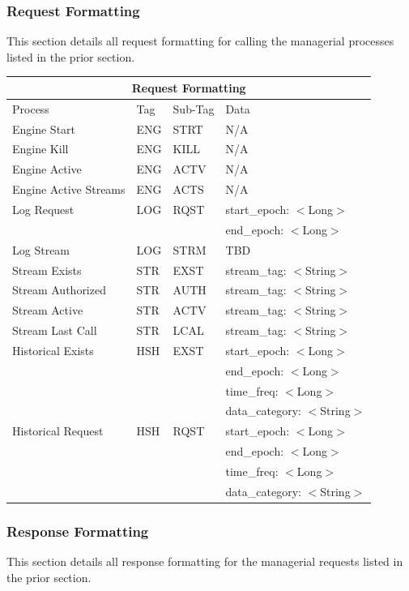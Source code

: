 \documentclass{article}
\begin{document}
\subsubsection{Request Formatting}
This section details all request formatting for calling the managerial processes listed in the prior section.

\begin{center}
\begin{tabular}{ | p{5cm} || p{2cm} | p{2cm} | p{6cm} | }
\hline
\multicolumn{4}{|c|}{Request Formatting}\\
\hline
Process & Tag & Sub-Tag & Data\\
\hline
Engine Start & ENG & STRT & N/A\\
\hline
Engine Kill & ENG & KILL & N/A\\
\hline
Engine Active & ENG & ACTV & N/A\\
\hline
Engine Active Streams & ENG & ACTS & N/A\\
\hline
Log Request & LOG & RQST & start\_epoch: $<$Long$>$\\
 &  &  & end\_epoch: $<$Long$>$\\
\hline
Log Stream & LOG & STRM & TBD\\
\hline
Stream Exists & STR & EXST & stream\_tag: $<$String$>$\\
\hline
Stream Authorized & STR & AUTH & stream\_tag: $<$String$>$\\
\hline
Stream Active & STR & ACTV & stream\_tag: $<$String$>$\\
\hline
Stream Last Call & STR & LCAL & stream\_tag: $<$String$>$\\
\hline
Historical Exists & HSH & EXST & start\_epoch: $<$Long$>$\\
 &  &  & end\_epoch: $<$Long$>$\\
 &  &  & time\_freq: $<$Long$>$\\
 &  &  & data\_category: $<$String$>$\\
\hline
Historical Request & HSH & RQST & start\_epoch: $<$Long$>$\\
 &  &  & end\_epoch: $<$Long$>$\\
 &  &  & time\_freq: $<$Long$>$\\
 &  &  & data\_category: $<$String$>$\\
\hline
\end{tabular}
\end{center}

\cleardoublepage
\subsubsection{Response Formatting}
This section details all response formatting for the managerial requests listed in the prior section.
\end{document}

